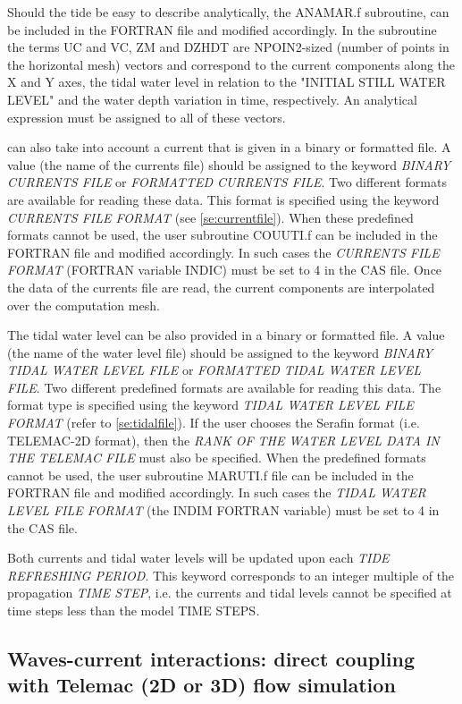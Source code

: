  Should the tide be easy to describe analytically, the ANAMAR.f subroutine, can be included in the FORTRAN file and modified accordingly. In the subroutine the terms UC and VC, ZM and DZHDT are NPOIN2-sized (number of points in the horizontal mesh) vectors and correspond to the current components along the X and Y axes, the tidal water level in relation to the "INITIAL STILL WATER LEVEL" and the water depth variation in time, respectively. An analytical expression must be assigned to all of these vectors.

 \tomawac can also take into account a current that is given in a binary or formatted file. A value (the name of the currents file) should be assigned to the keyword \textit{BINARY CURRENTS FILE} or\textit{ FORMATTED CURRENTS FILE}. Two different formats are available for reading these data. This format is specified using the keyword \textit{CURRENTS FILE FORMAT} (see \ref{se:currentfile}). When these predefined formats cannot be used, the user subroutine COUUTI.f can be included in the FORTRAN file and modified accordingly. In such cases the \textit{CURRENTS FILE FORMAT} (FORTRAN variable INDIC) must be set to 4 in the CAS file. Once the data of the currents file are read, the current components are interpolated over the computation mesh.

 The tidal water level can be also provided in a binary or formatted file. A value (the name of the water level file) should be assigned to the keyword \textit{BINARY TIDAL WATER LEVEL FILE} or\textit{ FORMATTED TIDAL WATER LEVEL FILE}. Two different predefined formats are available for reading this data. The format type is specified using the keyword \textit{TIDAL WATER LEVEL FILE FORMAT} (refer to \ref{se:tidalfile}). If the user chooses the Serafin format (i.e. TELEMAC-2D format), then the \textit{RANK OF THE WATER LEVEL DATA IN THE TELEMAC FILE} must also be specified. When the predefined formats cannot be used, the user subroutine MARUTI.f file can be included in the FORTRAN file and modified accordingly. In such cases the \textit{TIDAL WATER LEVEL FILE FORMAT} (the INDIM FORTRAN variable) must be set to 4 in the CAS file.

 Both currents and tidal water levels will be updated upon each \textit{TIDE REFRESHING PERIOD}. This keyword corresponds to an integer multiple of the propagation \textit{TIME STEP}, i.e. the currents and tidal levels cannot be specified at time steps less than the model TIME STEPS\textit{.}


\subsection{ Waves-current interactions: direct coupling with Telemac (2D or 3D) flow simulation}

